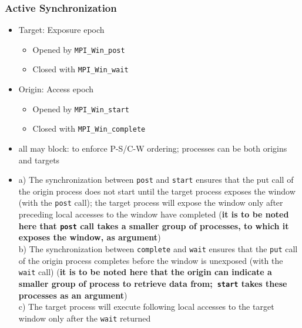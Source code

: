 \documentclass[12pt, a4paper]{report}
\begin{document}
\subsubsection{Active Synchronization}
\begin{itemize}
    \item Target: Exposure epoch
    \begin{itemize}
        \item Opened by \verb$MPI_Win_post$
        \item Closed with \verb$MPI_Win_wait$
    \end{itemize}
    \item Origin: Access epoch
    \begin{itemize}
        \item Opened by \verb$MPI_Win_start$
        \item Closed with \verb$MPI_Win_complete$
    \end{itemize}
    \item all may block: to enforce P-S/C-W ordering; processes can be both origins and targets
    \item a) The synchronization between \verb$post$ and \verb$start$ ensures that the put call of the origin process does not start until the target process 
          exposes the window (with the \verb$post$ call); the target process will expose the window only after preceding local accesses to the window have 
          completed ({\bfseries{it is to be noted here that \verb$post$ call takes a smaller group of processes, to which it exposes the window, as argument}})\\
          b) The synchronization between \verb$complete$ and \verb$wait$ ensures that the \verb$put$ call of the origin process completes before the window is
          unexposed (with the \verb$wait$ call) ({\bfseries{it is to be noted here that the origin can indicate a smaller group of process to retrieve data from;\
          \verb$start$ takes these processes as an argument}})\\
          c) The target process will execute following local accesses to the target window only after the \verb$wait$ returned
\end{itemize}
\end{document}
